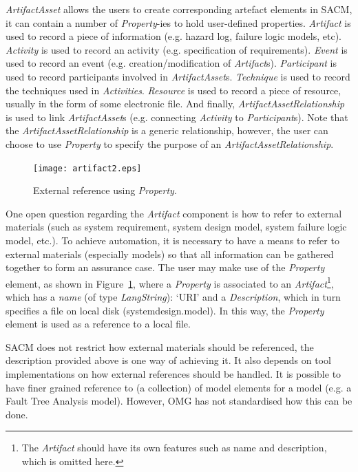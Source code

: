 \textit{ArtifactAsset} allows the users to create corresponding artefact elements in SACM, it can contain a number of \textit{Property}-ies to hold user-defined properties. \textit{Artifact} is used to record a piece of information (e.g. hazard log, failure logic models, etc). 
\textit{Activity} is used to record an activity (e.g. specification of requirements). 
\textit{Event} is used to record an event (e.g. creation/modification of \textit{Artifact}s). 
\textit{Participant} is used to record participants involved in \textit{ArtifactAsset}s. 
\textit{Technique} is used to record the techniques used in \textit{Activities}. 
\textit{Resource} is used to record a piece of resource, usually in the form of some electronic file. 
And finally, \textit{ArtifactAssetRelationship} is used to link \textit{ArtifactAsset}s (e.g. connecting \textit{Activity} to \textit{Participant}s). 
Note that the \textit{ArtifactAssetRelationship} is a generic relationship, however, the user can choose to use \textit{Property} to specify the purpose of an \textit{ArtifactAssetRelationship}. 

\begin{figure}
	\centering
	\texttt{[image: artifact2.eps]}
	\caption{External reference using \textit{Property}.}
	\label{fig:artifact1}
\end{figure}

One open question regarding the \textit{Artifact} component is how to refer to external materials (such as system requirement, system design model, system failure logic model, etc.). 
To achieve automation, it is necessary to have a means to refer to external materials (especially models) so that all information can be gathered together to form an assurance case. 
The user may make use of the \textit{Property} element, as shown in Figure~\ref{fig:artifact1}, where a \textit{Property} is associated to an \textit{Artifact}\footnote{The \textit{Artifact} should have its own features such as name and description, which is omitted here.}, which has a \textit{name} (of type \textit{LangString}): `URI' and a \textit{Description}, which in turn specifies a file on local disk (systemdesign.model). 
In this way, the \textit{Property} element is used as a reference to a local file. 

SACM does not restrict how external materials should be referenced, the description provided above is one way of achieving it. 
It also depends on tool implementations on how external references should be handled. 
It is possible to have finer grained reference to (a collection) of model elements for a model (e.g. a Fault Tree Analysis model). 
However, OMG has not standardised how this can be done.

